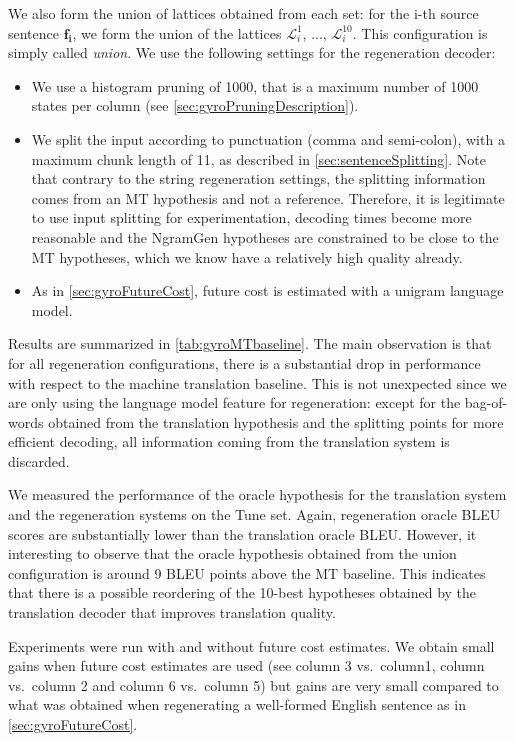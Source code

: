 We also form the union of lattices
obtained from each set:
for the i-th source sentence $\bm{f_i}$, we form the union
of the lattices $\mathcal{L}_i^1$, ..., $\mathcal{L}_i^{10}$.
This configuration is simply
called \emph{union}.
We use the following settings for the regeneration decoder:
%
\begin{itemize}
  \item We use a histogram pruning of 1000, that is a maximum number of 1000 states
    per column (see \autoref{sec:gyroPruningDescription}).
  \item We split the input according to punctuation (comma and semi-colon), with
    a maximum chunk length of 11, as described in \autoref{sec:sentenceSplitting}.
    Note that contrary to the string regeneration settings, the splitting information
    comes from an MT hypothesis and not a reference. Therefore, it is legitimate
    to use input splitting for experimentation, decoding times become more
    reasonable and the NgramGen hypotheses are constrained to be close to
    the MT hypotheses, which we know have a relatively high quality already.
  \item As in \autoref{sec:gyroFutureCost}, future cost is estimated with a unigram language model.
\end{itemize}
%
Results are summarized in \autoref{tab:gyroMTbaseline}.
The main observation is that for all regeneration configurations, there
is a substantial drop in performance with respect
to the machine translation baseline. This is not unexpected
since we are only using the language model feature for regeneration:
except for the bag-of-words obtained from the translation hypothesis and
the splitting points for more efficient decoding, all information coming from the translation system
is discarded.

We measured the performance of the oracle hypothesis %
for the translation system and the regeneration systems on the Tune set.
Again, regeneration oracle BLEU scores are substantially
lower than the translation oracle BLEU.
However, it interesting to observe that
the oracle hypothesis obtained from the union configuration is
around 9 BLEU points above the MT baseline. This indicates that
there is a possible reordering of the 10-best hypotheses obtained by
the translation decoder that improves translation quality.

Experiments were run with and without future cost estimates.
We obtain small gains when future cost estimates are used (see column 3 vs.\ column1,
column vs.\ column 2 and column 6 vs.\ column 5)
but gains are very small compared to what was obtained
when regenerating a well-formed English sentence as in \autoref{sec:gyroFutureCost}.

